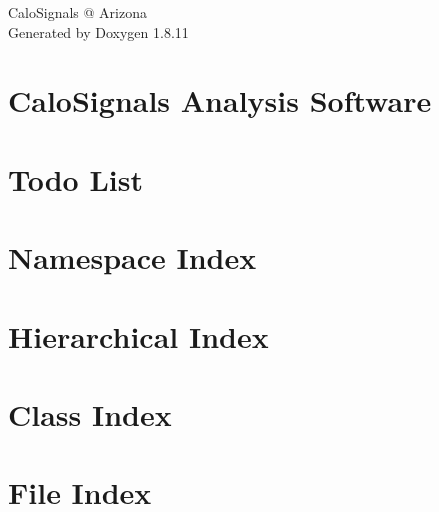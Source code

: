 \documentclass[twoside]{book}
\newcommand{\+}{\discretionary{\mbox{\scriptsize$\hookleftarrow$}}{}{}}
\newcommand{\clearemptydoublepage}{%
  \newpage{\pagestyle{empty}\cleardoublepage}%
}
\begin{document}
\hypersetup{pageanchor=false,
             bookmarksnumbered=true,
             pdfencoding=unicode
            }
\begin{titlepage}
\vspace*{7cm}
\begin{center}%
{\Large Calo\+Signals @ Arizona }\\
\vspace*{1cm}
{\large Generated by Doxygen 1.8.11}\\
\end{center}
\end{titlepage}
\clearemptydoublepage
\tableofcontents
\clearemptydoublepage
{}
\hypersetup{pageanchor=true}

\chapter{Calo\+Signals Analysis Software}
\label{index}\hypertarget{index}{}
\chapter{Todo List}
\label{todo}
\hypertarget{todo}{}

\chapter{Namespace Index}

\chapter{Hierarchical Index}

\chapter{Class Index}

\chapter{File Index}

\end{document}
